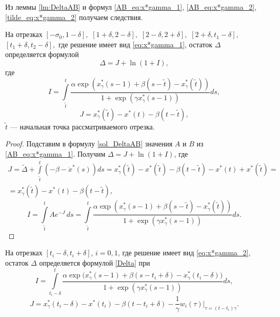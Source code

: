 Из леммы \eqref{lm:DeltaAB} и формул \eqref{AB_eq:x*gamma_1}, \eqref{AB_eq:x*gamma_2}, \eqref{tilde_eq:x*gamma_2} получаем следствия.
\begin{corollary}\label{corol_Delta_long}
На отрезках $[-\sigma_0, 1 - \delta],$ $[1 + \delta, 2 - \delta],$ $[2 - \delta, 2 + \delta],$ $[2 + \delta, t_1 - \delta],$ $[t_1 + \delta,t_2 - \delta],$ где решение имеет вид \eqref{eq:x*gamma_1}, остаток $\Delta$ определяется формулой
\begin{equation}
    \label{Delta}
    \Delta = J + \ln(1 + I),
\end{equation}
где 
\begin{equation}
    \label{I_long}
    I = \int\limits_{\tilde{t}}^{t}\frac{\alpha\exp(x_{\gamma}^*(s-1)+\beta(s-\tilde{t})-x_{\gamma}^*(\tilde{t}))}{1 + \exp(\gamma x_{\gamma}^*(s-1))} ds,
\end{equation}
%
\begin{equation}\label{eq:J_long}
    J = x_{\gamma}^*(\tilde{t}) - x^*(t) - \beta(t - \tilde{t}),
\end{equation}
%
$\tilde{t}$ --- начальная точка рассматриваемого отрезка.
\end{corollary}
%
\begin{proof}
	Подставим в формулу \eqref{sol_DeltaAB} значения $A$ и $B$ из \eqref{AB_eq:x*gamma_1}. Получим $\Delta = J + \ln(1 + I)$, где
\begin{multline*}
	J = \tilde{\Delta} + \int\limits_{\tilde{t}}^{t}(-\beta - \dot{x}^*(s))ds = x_{\gamma}^*(\tilde{t}) - x^*(\tilde{t}) - \beta(t - \tilde{t}) - x^*(t) + x^*(\tilde{t}) =\\= x_{\gamma}^*(\tilde{t}) - x^*(t) - \beta(t - \tilde{t}),
\end{multline*}
\[
	I = \int\limits_{\tilde{t}}^{t} A e^{-J} \, ds = \int\limits_{\tilde{t}}^{t}\frac{\alpha\exp(x_{\gamma}^*(s-1)+\beta(s-\tilde{t})-x_{\gamma}^*(\tilde{t}))}{1 + \exp(\gamma x_{\gamma}^*(s-1))} ds.
\]
\end{proof}
%
\begin{corollary}\label{corol_Delta_short}
На отрезках $[t_i - \delta, t_i + \delta]$, $i=0, 1$, где решение имеет вид \eqref{eq:x*gamma_2}, остаток $\Delta$ определяется формулой \eqref{Delta} при
 \begin{equation}
    \label{I_point}
   I=\int\limits_{t_i-\delta}^{t}\frac{\alpha\exp\big(x_{\gamma}^*(s-1)+\beta(s-t_i+\delta)-x_{\gamma}^*(t_i-\delta)\big)}{1+\exp(\gamma x_{\gamma}^*(s-1))}ds,
\end{equation}
%
\begin{equation}
    \label{J_point}
    J=x_{\gamma}^*(t_i - \delta) - x^*(t_i) - \beta(t-t_i+\delta) - \frac{1}{\gamma} w_i(\tau)|_{\tau=(t-t_i)\gamma}.
\end{equation}
\end{corollary}
